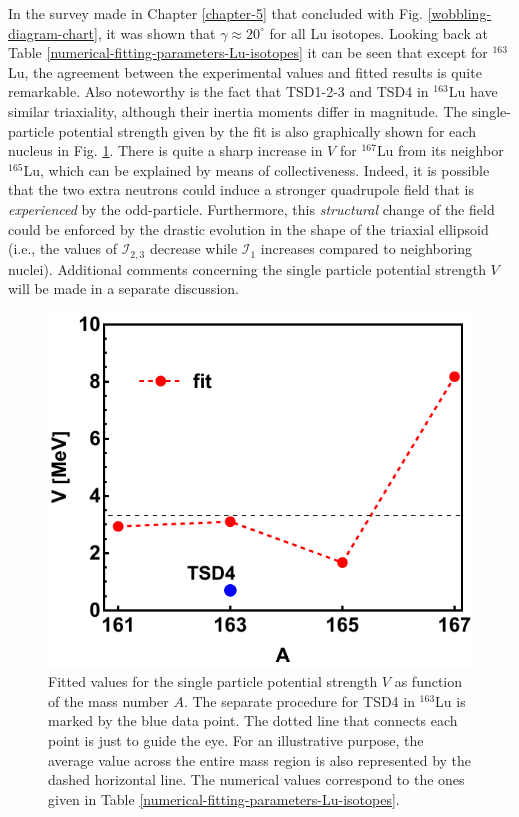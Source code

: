 In the survey made in Chapter \ref{chapter-5} that concluded with Fig. \ref{wobbling-diagram-chart}, it was shown that $\gamma\approx 20^\circ$ for all Lu isotopes. Looking back at Table \ref{numerical-fitting-parameters-Lu-isotopes} it can be seen that except for $^{163}$Lu, the agreement between the experimental values and fitted results is quite remarkable. Also noteworthy is the fact that TSD1-2-3 and TSD4 in $^{163}$Lu have similar triaxiality, although their inertia moments differ in magnitude. The single-particle potential strength given by the fit is also graphically shown for each nucleus in Fig. \ref{fig-V-param-fitting-procedure}. There is quite a sharp increase in $V$ for $^{167}$Lu from its neighbor $^{165}$Lu, which can be explained by means of collectiveness. Indeed, it is possible that the two extra neutrons could induce a stronger quadrupole field that is \emph{experienced} by the odd-particle. Furthermore, this \emph{structural} change of the field could be enforced by the drastic evolution in the shape of the triaxial ellipsoid (i.e., the values of $\mathcal{I}_{2,3}$ decrease while $\mathcal{I}_1$ increases compared to neighboring nuclei). Additional comments concerning the single particle potential strength $V$ will be made in a separate discussion.
\begin{figure}
    \centering
    \includegraphics[scale=0.8]{Chapters/Figures/V-param-fitting.pdf}
    \caption{Fitted values for the single particle potential strength $V$ as function of the mass number $A$. The separate procedure for TSD4 in $^{163}$Lu is marked by the blue data point. The dotted line that connects each point is just to guide the eye. For an illustrative purpose, the average value across the entire mass region is also represented by the dashed horizontal line. The numerical values correspond to the ones given in Table \ref{numerical-fitting-parameters-Lu-isotopes}.}
    \label{fig-V-param-fitting-procedure}
\end{figure}

